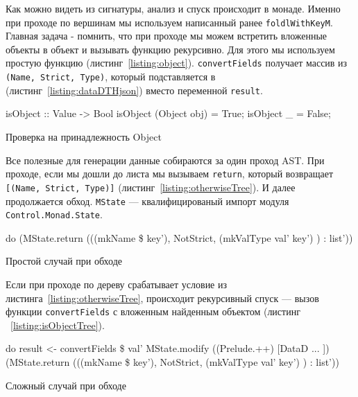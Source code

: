 Как можно видеть из сигнатуры, анализ и спуск происходит в монаде. Именно при проходе по вершинам мы используем написанный ранее \lstinline{foldlWithKeyM}. Главная задача - помнить, что при проходе мы можем встретить вложенные объекты в объект и вызывать функцию рекурсивно. Для этого мы используем простую функцию (листинг~\ref{listing:object}). \lstinline{convertFields} получает массив из \lstinline{(Name, Strict, Type)}, который подставляется в (листинг~\ref{listing:dataDTHjson}) вместо переменной \lstinline{result}.

\begin{ListingEnv}[H]
\begin{Verb}
isObject :: Value -> Bool
isObject (Object obj) = True;
isObject _ = False;
\end{Verb}
\caption{Проверка на принадлежность Object}
\label{listing:object}
\end{ListingEnv} 

Все полезные для генерации данные собираются за один проход AST. При проходе, если мы дошли до листа мы вызываем \lstinline{return}, который возвращает \lstinline{[(Name, Strict, Type)]} (листинг~\ref{listing:otherwiseTree}). И далее продолжается обход. \lstinline{MState} --- квалифицированый импорт модуля \lstinline{Control.Monad.State}.

\begin{ListingEnv}[H]
\begin{Verb}
do
      (MState.return (((mkName \$  key'), NotStrict,
                                (mkValType val' key') ) : list'))
\end{Verb}
\caption{Простой случай при обходе}
\label{listing:otherwiseTree}
\end{ListingEnv} 

Если при проходе по дереву срабатывает условие из листинга~\ref{listing:otherwiseTree}, происходит рекурсивный спуск --- вызов функции \lstinline{convertFields} с вложенным найденным объектом (листинг ~\ref{listing:isObjectTree}).

\begin{ListingEnv}[H]
\begin{Verb}
do
      result <- convertFields \$ val'
      MState.modify ((Prelude.++) [DataD ... ])
      (MState.return (((mkName \$  key'), NotStrict,
                                (mkValType val' key') ) : list'))
\end{Verb}
\caption{Сложный случай при обходе}
\label{listing:isObjectTree}
\end{ListingEnv} 

